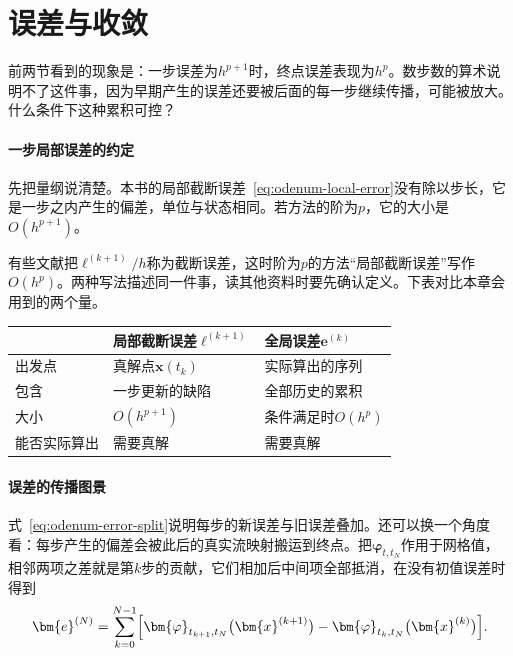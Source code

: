 \section{误差与收敛}
\label{sec:odenum-error-convergence}

前两节看到的现象是：一步误差为$h^{p+1}$时，终点误差表现为$h^{p}$。数步数的算术说明不了这件事，因为早期产生的误差还要被后面的每一步继续传播，可能被放大。什么条件下这种累积可控？

\paragraph{一步局部误差的约定}
先把量纲说清楚。本书的局部截断误差~\eqref{eq:odenum-local-error}没有除以步长，它是一步之内产生的偏差，单位与状态相同。若方法的阶为$p$，它的大小是$O(h^{p+1})$。

有些文献把$\bm{\ell}^{(k+1)}/h$称为截断误差，这时阶为$p$的方法“局部截断误差”写作$O(h^{p})$。两种写法描述同一件事，读其他资料时要先确认定义。下表对比本章会用到的两个量。

\begin{BookInlineTable}
 \centering
 \caption{局部截断误差与全局误差的对比（阶为$p$的方法）。}
 \label{tab:odenum-local-global}
 \begin{tabular}{lll}
  \toprule
  & 局部截断误差$\bm{\ell}^{(k+1)}$ & 全局误差$\bm{e}^{(k)}$\\
  \midrule
  出发点 & 真解点$\bm{x}(t_k)$ & 实际算出的序列\\
  包含 & 一步更新的缺陷 & 全部历史的累积\\
  大小 & $O(h^{p+1})$ & 条件满足时$O(h^{p})$\\
  能否实际算出 & 需要真解 & 需要真解\\
  \bottomrule
 \end{tabular}
\end{BookInlineTable}

\paragraph{误差的传播图景}
式~\eqref{eq:odenum-error-split}说明每步的新误差与旧误差叠加。还可以换一个角度看：每步产生的偏差会被此后的真实流映射搬运到终点。把$\bm{\varphi}_{t,t_N}$作用于网格值，相邻两项之差就是第$k$步的贡献，它们相加后中间项全部抵消，在没有初值误差时得到
\begin{equation}
 \bm{e}^{(N)}=\sum_{k=0}^{N-1}\Bigl[\bm{\varphi}_{t_{k+1},t_N}\bigl(\bm{x}^{(k+1)}\bigr)-\bm{\varphi}_{t_k,t_N}\bigl(\bm{x}^{(k)}\bigr)\Bigr].
 \label{eq:odenum-telescoping}
\end{equation}

